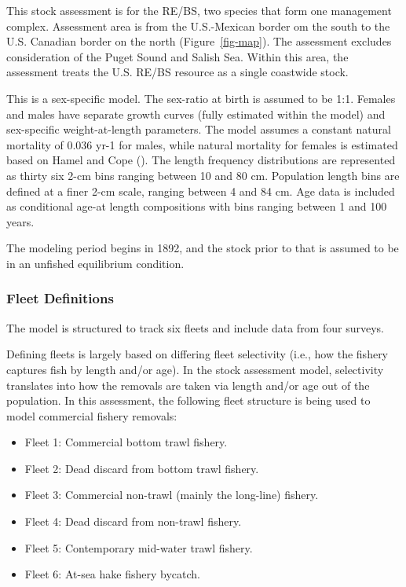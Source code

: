 \documentclass[
]{scrartcl}
\providecommand{\tightlist}{%
  \setlength{\itemsep}{0pt}\setlength{\parskip}{0pt}}\usepackage{longtable,booktabs,array}
\begin{document}
This stock assessment is for the RE/BS, two species that form one
management complex. Assessment area is from the U.S.-Mexican border om
the south to the U.S. Canadian border on the north
(Figure~\ref{fig-map}). The assessment excludes consideration of the
Puget Sound and Salish Sea. Within this area, the assessment treats the
U.S. RE/BS resource as a single coastwide stock.

This is a sex-specific model. The sex-ratio at birth is assumed to be
1:1. Females and males have separate growth curves (fully estimated
within the model) and sex-specific weight-at-length parameters. The
model assumes a constant natural mortality of 0.036 yr-1 for males,
while natural mortality for females is estimated based on Hamel and Cope
(). The length frequency
distributions are represented as thirty six 2-cm bins ranging between 10
and 80 cm. Population length bins are defined at a finer 2-cm scale,
ranging between 4 and 84 cm. Age data is included as conditional age-at
length compositions with bins ranging between 1 and 100 years.

The modeling period begins in 1892, and the stock prior to that is
assumed to be in an unfished equilibrium condition.

\subsubsection{Fleet Definitions}\label{sec-fleet}

The model is structured to track six fleets and include data from four
surveys.

Defining fleets is largely based on differing fleet selectivity (i.e.,
how the fishery captures fish by length and/or age). In the stock
assessment model, selectivity translates into how the removals are taken
via length and/or age out of the population. In this assessment, the
following fleet structure is being used to model commercial fishery
removals:

\begin{itemize}
\tightlist
\item
  Fleet 1: Commercial bottom trawl fishery.
\item
  Fleet 2: Dead discard from bottom trawl fishery.
\item
  Fleet 3: Commercial non-trawl (mainly the long-line) fishery.
\item
  Fleet 4: Dead discard from non-trawl fishery.
\item
  Fleet 5: Contemporary mid-water trawl fishery.
\item
  Fleet 6: At-sea hake fishery bycatch.
\end{itemize}
\end{document}
